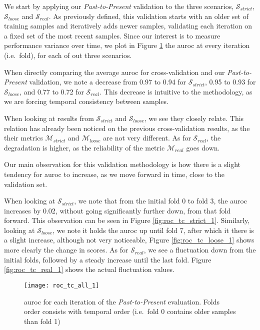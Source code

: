 We start by applying our \textit{Past-to-Present} validation to the three scenarios, $\mathcal{S}_{strict}$, $\mathcal{S}_{loose}$ and $\mathcal{S}_{real}$. As previously defined, this validation starts with an older set of training samples and iteratively adds newer samples, validating each iteration on a fixed set of the most recent samples. Since our interest is to measure performance variance over time, we plot in Figure \ref{fig:roc_tc_1} the \gls{auroc} at every iteration (i.e.\ fold), for each of out three scenarios.

When directly comparing the average \gls{auroc} for cross-validation and our \textit{Past-to-Present} validation, we note a decrease from 0.97 to 0.94 for $\mathcal{S}_{strict}$, 0.95 to 0.93 for $\mathcal{S}_{loose}$, and 0.77 to 0.72 for $\mathcal{S}_{real}$. This decrease is intuitive to the methodology, as we are forcing temporal consistency between samples.

When looking at results from $\mathcal{S}_{strict}$ and $\mathcal{S}_{loose}$, we see they closely relate. This relation has already been noticed on the previous cross-validation results, as the their metrics $\mathcal{M}_{strict}$ and $\mathcal{M}_{loose}$ are not very different. As for $\mathcal{S}_{real}$, the degradation is higher, as the reliability of the metric $\mathcal{M}_{real}$ goes down.

Our main observation for this validation methodology is how there is a slight tendency for \gls{auroc} to increase, as we move forward in time, close to the validation set.

When looking at $\mathcal{S}_{strict}$, we note that from the initial fold 0 to fold 3, the \gls{auroc} increases by 0.02, without going significantly further down, from that fold forward. This observation can be seen in Figure \ref{fig:roc_tc_strict_1}. Similarly, looking at $\mathcal{S}_{loose}$, we note it holds the \gls{auroc} up until fold 7, after which it there is a slight increase, although not very noticeable, Figure \ref{fig:roc_tc_loose_1} shows more clearly the change in scores. As for $\mathcal{S}_{real}$, we see a fluctuation down from the initial folds, followed by a steady increase until the last fold. Figure \ref{fig:roc_tc_real_1} shows the actual fluctuation values.

\begin{figure}[!h]
	\centering
	\texttt{[image: roc\_tc\_all\_1]}
	\caption{\gls{auroc} for each iteration of the \textit{Past-to-Present} evaluation. Folds order consists with temporal order (i.e.\ fold 0 contains older samples than fold 1)}
	\label{fig:roc_tc_1}
\end{figure}

